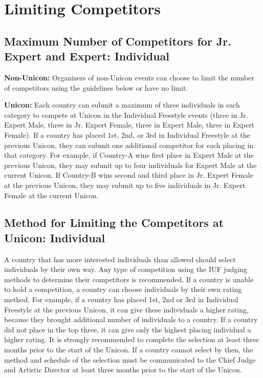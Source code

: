 \section{Limiting Competitors}

\subsection{Maximum Number of Competitors for Jr. Expert and Expert: Individual}
\textbf{Non-Unicon:} Organizers of non-Unicon events can choose to limit the number of competitors using the guidelines below or have no limit. %

\textbf{Unicon:} Each country can submit a maximum of three individuals in each category to compete at Unicon in the Individual Freestyle events (three in Jr. Expert Male, three in Jr. Expert Female, three in Expert Male, three in Expert Female).
If a country has placed 1st, 2nd, or 3rd in Individual Freestyle at the previous Unicon, they can submit one additional competitor for each placing in that category.
For example, if Country-A wins first place in Expert Male at the previous Unicon, they may submit up to four individuals for Expert Male at the current Unicon.
If Country-B wins second and third place in Jr. Expert Female at the previous Unicon, they may submit up to five individuals in Jr. Expert Female at the current Unicon.

\subsection{Method for Limiting the Competitors at Unicon: Individual} %
A country that has more interested individuals than allowed should select individuals by their own way.
Any type of competition using the IUF judging methods to determine their competitors is recommended.
If a country is unable to hold a competition, a country can choose individuals by their own rating method.
For example, if a country has placed 1st, 2nd or 3rd in Individual Freestyle at the previous Unicon, it can give these individuals a higher rating, because they brought additional number of individuals to a country.
If a country did not place in the top three, it can give only the highest placing individual a higher rating.
It is strongly recommended to complete the selection at least three months prior to the start of the Unicon.
If a country cannot select by then, the method and schedule of the selection must be communicated to the Chief Judge and Artistic Director at least three months prior to the start of the Unicon.

